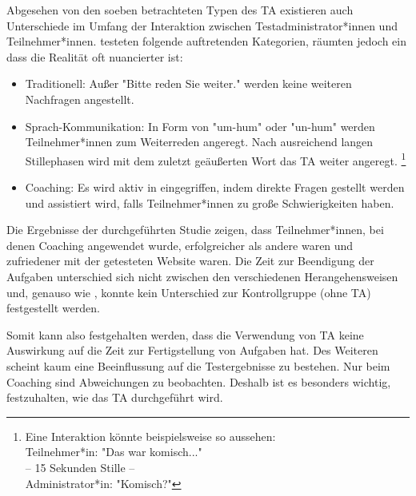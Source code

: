 Abgesehen von den soeben betrachteten Typen des \acl{TA} existieren auch Unterschiede im Umfang der Interaktion zwischen Testadministrator*innen und Teilnehmer*innen. \citeauthor{olmsted-hawalaThinkaloudProtocols2010} \cite{olmsted-hawalaThinkaloudProtocols2010} testeten folgende auftretenden Kategorien, räumten jedoch ein dass die Realität oft nuancierter ist:
\begin{itemize}
  \item Traditionell: Außer "Bitte reden Sie weiter." werden keine weiteren Nachfragen angestellt.
  \item Sprach-Kommunikation: In Form von "um-hum" oder "un-hum" werden Teilnehmer*innen zum Weiterreden angeregt. Nach ausreichend langen Stillephasen wird mit dem zuletzt geäußerten Wort das \acl{TA} weiter angeregt. \footnote{Eine Interaktion könnte beispielsweise so aussehen:\\ Teilnehmer*in: "Das war komisch..." \\ -- 15 Sekunden Stille -- \\ Administrator*in: "Komisch?"} 
  \item Coaching: Es wird aktiv in eingegriffen, indem direkte Fragen gestellt werden und assistiert wird, falls Teilnehmer*innen zu große Schwierigkeiten haben.
\end{itemize}
Die Ergebnisse der \citeyear{olmsted-hawalaThinkaloudProtocols2010} durchgeführten Studie zeigen, dass Teilnehmer*innen, bei denen Coaching angewendet wurde, erfolgreicher als andere waren und zufriedener mit der getesteten Website waren. Die Zeit zur Beendigung der Aufgaben unterschied sich nicht zwischen den verschiedenen Herangehensweisen und, genauso wie \citeauthor{alhadretiRethinkingThinking2018}, konnte kein Unterschied zur Kontrollgruppe (ohne \ac{TA}) festgestellt werden.

Somit kann also festgehalten werden, dass die Verwendung von \ac{TA} keine Auswirkung auf die Zeit zur Fertigstellung von Aufgaben hat. Des Weiteren scheint kaum eine Beeinflussung auf die Testergebnisse zu bestehen. Nur beim Coaching sind Abweichungen zu beobachten. Deshalb ist es besonders wichtig, festzuhalten, wie das \acl{TA} durchgeführt wird.
\cite{olmsted-hawalaThinkaloudProtocols2010}
